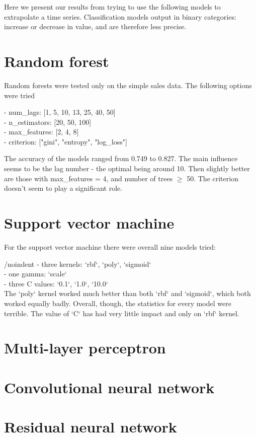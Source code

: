 Here we present our results from trying to use the following models to extrapolate a time series.
Classification models output in binary categories: increase or decrease in value, and are therefore less precise.

\section{Random forest}
Random forests were tested only on the simple sales data.
The following options were tried

\noindent
- num\_lags: [1, 5, 10, 13, 25, 40, 50]\\
- n\_estimators: [20, 50, 100]\\
- max\_features: [2, 4, 8]\\
- criterion: ["gini", "entropy", "log\_loss"]

The accuracy of the models ranged from 0.749 to 0.827. The main influence seems to be the lag number - the optimal being around 10. Then slightly better are those with max\_features = 4, and number of trees $\ge$ 50. The criterion doesn't seem to play a significant role.
\section{Support vector machine}
For the support vector machine there were overall nine models tried:

/noindent
- three kernels: `rbf`, `poly`, `sigmoid`\\
- one gamma: `scale`\\
- three C values: `0.1`, `1.0`, `10.0` \\

The `poly` kernel worked much better than both `rbf` and `sigmoid`, which both worked equally badly. Overall, though, the statistics for every model were terrible. The value of `C` has had very little impact and only on `rbf` kernel.
\section{Multi-layer perceptron}
\section{Convolutional neural network}
\section{Residual neural network}
